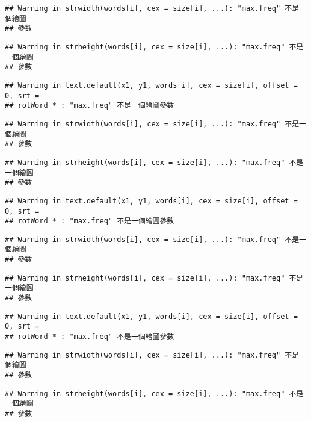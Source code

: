 \documentclass[]{article}
\begin{document}
\begin{verbatim}
## Warning in strwidth(words[i], cex = size[i], ...): "max.freq" 不是一個繪圖
## 參數
\end{verbatim}

\begin{verbatim}
## Warning in strheight(words[i], cex = size[i], ...): "max.freq" 不是一個繪圖
## 參數
\end{verbatim}

\begin{verbatim}
## Warning in text.default(x1, y1, words[i], cex = size[i], offset = 0, srt =
## rotWord * : "max.freq" 不是一個繪圖參數
\end{verbatim}

\begin{verbatim}
## Warning in strwidth(words[i], cex = size[i], ...): "max.freq" 不是一個繪圖
## 參數
\end{verbatim}

\begin{verbatim}
## Warning in strheight(words[i], cex = size[i], ...): "max.freq" 不是一個繪圖
## 參數
\end{verbatim}

\begin{verbatim}
## Warning in text.default(x1, y1, words[i], cex = size[i], offset = 0, srt =
## rotWord * : "max.freq" 不是一個繪圖參數
\end{verbatim}

\begin{verbatim}
## Warning in strwidth(words[i], cex = size[i], ...): "max.freq" 不是一個繪圖
## 參數
\end{verbatim}

\begin{verbatim}
## Warning in strheight(words[i], cex = size[i], ...): "max.freq" 不是一個繪圖
## 參數
\end{verbatim}

\begin{verbatim}
## Warning in text.default(x1, y1, words[i], cex = size[i], offset = 0, srt =
## rotWord * : "max.freq" 不是一個繪圖參數
\end{verbatim}

\begin{verbatim}
## Warning in strwidth(words[i], cex = size[i], ...): "max.freq" 不是一個繪圖
## 參數
\end{verbatim}

\begin{verbatim}
## Warning in strheight(words[i], cex = size[i], ...): "max.freq" 不是一個繪圖
## 參數
\end{verbatim}
\end{document}
